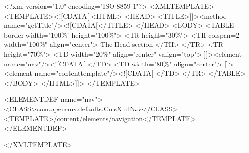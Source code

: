 <?xml version="1.0" encoding="ISO-8859-1"?>
<XMLTEMPLATE>
<TEMPLATE><![CDATA[
    <HTML>
    <HEAD>
        <TITLE>]]><method name="getTitle"/><![CDATA[</TITLE>
    </HEAD>
    <BODY>
    <TABLE border width="100\%" height="100\%">
        <TR height="30\%">
        <TH colspan=2 width="100\%" align="center">
            The Head section
        </TH>
        </TR>
        <TR height="70\%">
        <TD width="20\%" align="center" valign="top">
            ]]><element name="nav"/><![CDATA[
        </TD>
        <TD width="80\%" align="center">
            ]]><element name="contenttemplate"/><![CDATA[
        </TD>
    </TR>
    </TABLE>
    </BODY>
    </HTML>]]>
</TEMPLATE>

<ELEMENTDEF name="nav">
    <CLASS>com.opencms.defaults.CmsXmlNav</CLASS>
    <TEMPLATE>/content/elements/navigation</TEMPLATE>
</ELEMENTDEF>

</XMLTEMPLATE>
